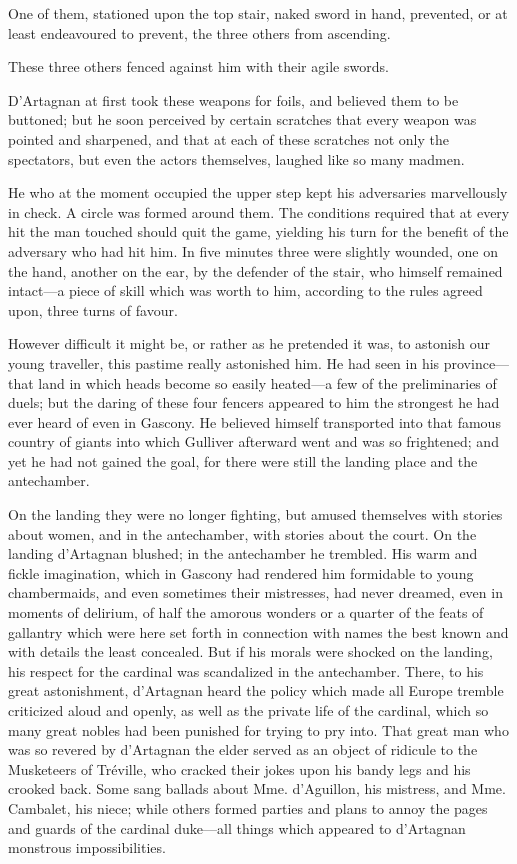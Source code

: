One of them, stationed upon the top stair, naked sword in hand, prevented, or at least endeavoured to prevent, the three others from ascending. 

These three others fenced against him with their agile swords. 

D'Artagnan at first took these weapons for foils, and believed them to be buttoned; but he soon perceived by certain scratches that every weapon was pointed and sharpened, and that at each of these scratches not only the spectators, but even the actors themselves, laughed like so many madmen. 

He who at the moment occupied the upper step kept his adversaries marvellously in check. A circle was formed around them. The conditions required that at every hit the man touched should quit the game, yielding his turn for the benefit of the adversary who had hit him. In five minutes three were slightly wounded, one on the hand, another on the ear, by the defender of the stair, who himself remained intact---a piece of skill which was worth to him, according to the rules agreed upon, three turns of favour. 

However difficult it might be, or rather as he pretended it was, to astonish our young traveller, this pastime really astonished him. He had seen in his province---that land in which heads become so easily heated---a few of the preliminaries of duels; but the daring of these four fencers appeared to him the strongest he had ever heard of even in Gascony. He believed himself transported into that famous country of giants into which Gulliver afterward went and was so frightened; and yet he had not gained the goal, for there were still the landing place and the antechamber. 

On the landing they were no longer fighting, but amused themselves with stories about women, and in the antechamber, with stories about the court. On the landing d'Artagnan blushed; in the antechamber he trembled. His warm and fickle imagination, which in Gascony had rendered him formidable to young chambermaids, and even sometimes their mistresses, had never dreamed, even in moments of delirium, of half the amorous wonders or a quarter of the feats of gallantry which were here set forth in connection with names the best known and with details the least concealed. But if his morals were shocked on the landing, his respect for the cardinal was scandalized in the antechamber. There, to his great astonishment, d'Artagnan heard the policy which made all Europe tremble criticized aloud and openly, as well as the private life of the cardinal, which so many great nobles had been punished for trying to pry into. That great man who was so revered by d'Artagnan the elder served as an object of ridicule to the Musketeers of Tréville, who cracked their jokes upon his bandy legs and his crooked back. Some sang ballads about Mme. d'Aguillon, his mistress, and Mme. Cambalet, his niece; while others formed parties and plans to annoy the pages and guards of the cardinal duke---all things which appeared to d'Artagnan monstrous impossibilities. 

